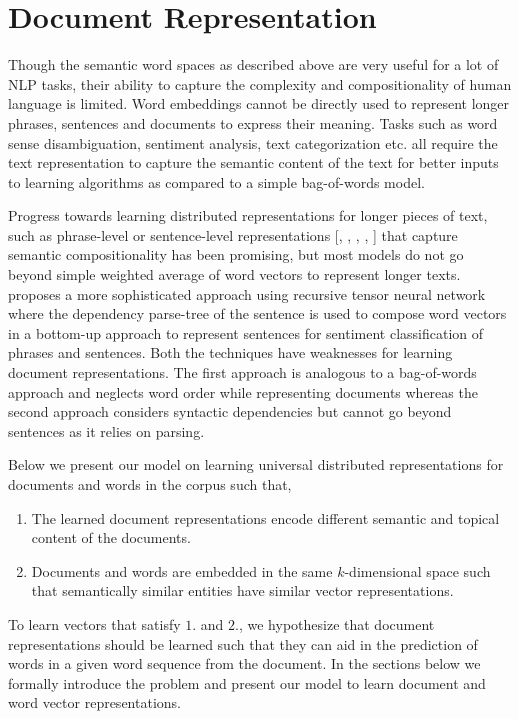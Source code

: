 \section{Document Representation}
\label{sec:document_embeddings}
Though the semantic word spaces as described above are very useful for a lot of NLP tasks, their ability to capture the complexity and compositionality of human language is limited. 
Word embeddings cannot be directly used to represent longer phrases, sentences and documents to express their meaning. 
Tasks such as word sense disambiguation, sentiment analysis, text categorization etc. all require the text representation to capture the semantic content of the text for better inputs to learning algorithms as compared to a simple bag-of-words model. 

Progress towards learning distributed representations for longer pieces of text, such as phrase-level or sentence-level representations [\cite{mitchell2010composition}, \cite{zanzotto2010estimating}, \cite{yessenalina2011compositional}, \cite{grefenstette2013multi}, \cite{mikolov2013distributed}] that capture semantic compositionality has been promising, but most models do not go beyond simple weighted average of word vectors to represent longer texts. 
\cite{socher2013recursive} proposes a more sophisticated approach using recursive tensor neural network where the dependency parse-tree of the sentence is used to compose word vectors in a bottom-up approach to represent sentences for sentiment classification of phrases and sentences. 
Both the techniques have weaknesses for learning document representations. The first approach is analogous to a bag-of-words approach and neglects word order while representing documents whereas the second approach considers syntactic dependencies but cannot go beyond sentences as it relies on parsing.

Below we present our model on learning universal distributed representations for documents and words in the corpus such that,
\begin{enumerate}
\item The learned document representations encode different semantic and topical content of the documents.
\item Documents and words are embedded in the same $k$-dimensional space such that semantically similar entities have similar vector representations.
\end{enumerate}
To learn vectors that satisfy $1.$ and $2.$, we hypothesize that document representations should be learned such that they can aid in the prediction of words in a given word sequence from the document. In the sections below we formally introduce the problem and present our model to learn document and word vector representations.

